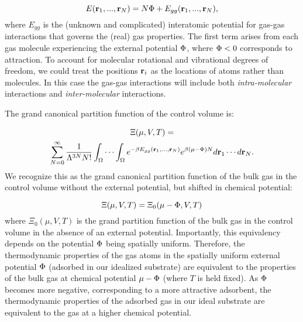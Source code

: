 \begin{equation} E(\mathbf{r}_1,...,\mathbf{r}_N) = N\Phi +
E_{gg}(\mathbf{r}_1,...,\mathbf{r}_N),
\end{equation}
where $E_{gg}$ is the (unknown and complicated) interatomic potential for
gas-gas interactions that governs the (real) gas properties. The first term
arises from each gas molecule experiencing the external potential $\Phi$, where
$\Phi < 0$ corresponds to attraction. To account for molecular rotational and
vibrational degrees of freedom, we could treat the positions $\mathbf{r}_i$ as the
locations of atoms rather than molecules. In this case the gas-gas interactions
will include both \emph{intra-molecular} interactions and
\emph{inter-molecular} interactions.

The grand canonical partition function of the control volume is:

\begin{multline}
    \Xi(\mu, V, T)= \\ \displaystyle \sum_{N=0}^\infty \frac{1}{\Lambda^{3N}N!} \int_{\Omega} \cdots \int_{\Omega} e^{-\beta E_{gg}(\mathbf{r}_1, ..., \mathbf{r}_N)} e^{\beta (\mu - \Phi) N} d\mathbf{r}_1 \cdots d\mathbf{r}_N.
    \label{eq:gcpf}
\end{multline}
We recognize this as the grand canonical partition function of the bulk gas in
the control volume without the external potential, but shifted in chemical
potential:

\begin{equation}
    \Xi(\mu, V, T)=\Xi_0(\mu - \Phi, V, T)
    \label{eq:xi_vs_xi0}
\end{equation}
where $\Xi_0(\mu, V, T)$ is the grand partition function of the bulk
gas in the control volume in the absence of an external potential. Importantly,
this equivalency depends on the potential $\Phi$ being spatially uniform.
Therefore, the thermodynamic properties of the gas atoms in the spatially
uniform external potential $\Phi$ (adsorbed in our idealized substrate)
are equivalent to the properties of the bulk gas at chemical potential $\mu-\Phi$
(where $T$ is held fixed). As $\Phi$ becomes more negative, corresponding to a
more attractive adsorbent, the thermodynamic properties of the adsorbed gas in
our ideal substrate are equivalent to the gas at a higher chemical potential.

